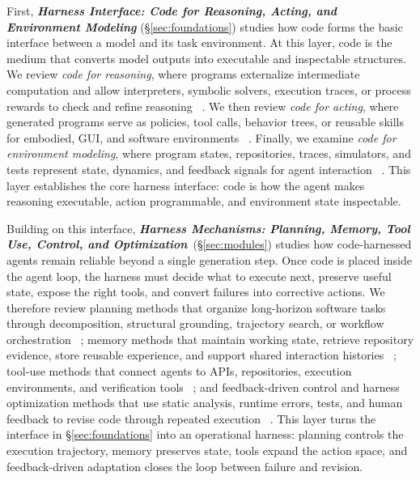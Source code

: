 First, \emph{\textbf{Harness Interface: Code for Reasoning, Acting, and
Environment Modeling}} (\S\ref{sec:foundations}) studies how code
forms the basic interface between a model and its task
environment.
At this layer, code is the medium that converts model outputs into
executable and inspectable structures.
We review \emph{code for reasoning}, where programs externalize
intermediate computation and allow interpreters, symbolic solvers,
execution traces, or process rewards to check and refine reasoning
~\cite{gao2023pal,chen2022program,li2023chain,ye2023satlm,ni2024next,li2025codeprm}.
We then review \emph{code for acting}, where generated programs
serve as policies, tool calls, behavior trees, or reusable skills
for embodied, GUI, and software environments
~\cite{ahn2022can,liang2023code,wang2023voyager,mu2024robocodex,zhang2025codebt,lin2026ui}.
Finally, we examine \emph{code for environment modeling}, where
program states, repositories, traces, simulators, and tests
represent state, dynamics, and feedback signals for agent
interaction
~\cite{tang2024worldcoder,copet2025cwm,zheng2026code2world,jimenez2023swe,liu2023agentbench,gandhi2026endless}.
This layer establishes the core harness interface: code is how the
agent makes reasoning executable, action programmable, and
environment state inspectable.

Building on this interface, \emph{\textbf{Harness Mechanisms:
Planning, Memory, Tool Use, Control, and Optimization}}~(\S\ref{sec:modules})
studies how code-harnessed agents remain reliable beyond a single
generation step.
Once code is placed inside the agent loop, the harness must decide
what to execute next, preserve useful state, expose the right
tools, and convert failures into corrective actions.
We therefore review planning methods that organize long-horizon
software tasks through decomposition, structural grounding,
trajectory search, or workflow orchestration
~\cite{jiang2024selfplanning,gur2023webagent,bairi2024codeplan,li2025codetree,islam2024mapcoder};
memory methods that maintain working state, retrieve repository
evidence, store reusable experience, and support shared
interaction histories
~\cite{gaurav2025codemem,zhang2024autocoderover,zhang2023repocoder,wang2026memgovern};
tool-use methods that connect agents to APIs, repositories,
execution environments, and verification tools
~\cite{zhang2023toolcoder,liu2024toolnet};
and feedback-driven control and harness optimization methods that use static analysis,
runtime errors, tests, and human feedback to revise code through
repeated execution
~\cite{huang2023agentcoder,ukai2024adacoder,Nunez2024AutoSafeCoder,li2026agentharness}.
This layer turns the interface in \S\ref{sec:foundations} into an
operational harness: planning controls the execution trajectory,
memory preserves state, tools expand the action space, and
feedback-driven adaptation closes the loop between failure and revision.

